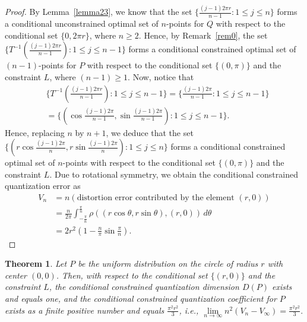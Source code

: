 \documentclass[12pt, reqno]{amsart}
\theoremstyle{plain}
\newtheorem{theorem1}[subsubsection]{Theorem}
\theoremstyle{definition}
\newcommand{\set}[1]{\{#1\}}%
\newcommand{\gq}{\theta}
\newcommand{\te}{\text}%
\begin{document}
\begin{proof}
By Lemma~\ref{lemma23}, we know that the set $\{\frac{(j-1)2\pi r}{n-1} : 1\leq j\leq n\}$ forms a conditional unconstrained optimal set of $n$-points for $Q$ with respect to the conditional set $\set{0, 2\pi r}$, where $n\geq 2$. Hence, by Remark~\ref{rem0}, the set 
$\set{T^{-1}(\frac{(j-1)2\pi r}{n-1}) : 1\leq j\leq n-1}$ forms a conditional constrained optimal set of $(n-1)$-points for $P$ with respect to the conditional set $\set{(0, \pi)}$ and the constraint $L$, where $(n-1)\geq 1$.  
Now, notice that 
\begin{align*}
&\set{T^{-1}(\frac{(j-1)2\pi r}{n-1}) : 1\leq j\leq n-1}=\set{\frac{(j-1)2\pi}{n-1} : 1\leq j\leq n-1}\\
&=\set{(\cos \frac{(j-1)2\pi}{n-1}, \sin \frac{(j-1)2\pi}{n-1}) : 1\leq j\leq n-1}.
\end{align*}
Hence, replacing $n$ by $n+1$, we deduce that the set $\set{(r\cos \frac{(j-1)2\pi}{n}, r\sin \frac{(j-1)2\pi}{n}) : 1\leq j\leq n}$ forms a conditional constrained optimal set of $n$-points with respect to the conditional set $\set{(0, \pi)}$ and the constraint $L$. Due to rotational symmetry, we obtain the conditional constrained quantization error as 
\begin{align*}
V_n&=n  (\te{distortion error contributed by the element } (r, 0))\\
&=\frac {n} {2\pi} \int_{-\frac {\pi} n}^{\frac {\pi} n} \rho((r\cos \gq, r\sin \gq), (r, 0))\,d\gq\\
&=2r^2(1-\frac n \pi\sin \frac \pi n). 
\end{align*} 
\end{proof}

\begin{theorem1}\label{theo451}
Let $P$ be the uniform distribution on the circle of radius $r$ with center $(0, 0)$. Then, with respect to the conditional set $\set{(r, 0)}$ and the constraint $L$, the conditional constrained quantization dimension $D(P)$ exists and equals one, and the conditional constrained quantization coefficient for $P$ exists as a finite positive number and equals $\frac{\pi ^2 r^2}{3}$, i.e.,
$\lim\limits_{n\to \infty} n^2 (V_n-V_\infty)=\frac{\pi ^2 r^2}{3}.$
\end{theorem1}
\end{document}
